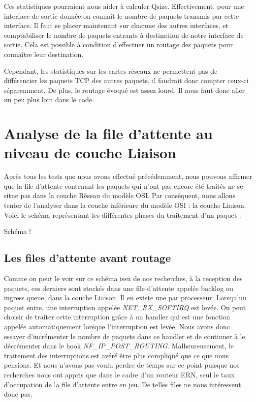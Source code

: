 \documentclass[a4paper]{article}
\begin{document}
Ces statistiques pourraient nous aider à calculer Qsize. 
Effectivement, pour une interface de sortie donnée on connaît le
nombre de paquets transmis par cette interface.
Il faut se placer maintenant sur chacune des autres interfaces, et
comptabiliser le nombre de paquets entrants à destination
de notre interface de sortie. Cela est possible à condition
d'effectuer un routage des paquets pour connaître leur destination.

Cependant, les statistiques sur les cartes réseaux ne permettent pas de
différencier les paquets TCP des autres paquets, il faudrait
donc compter ceux-ci séparemment. De plus, le routage évoqué
est assez lourd. Il nous faut donc aller un peu plus loin dans le code.

\section{Analyse de la file d'attente au niveau de couche Liaison}

Après tous les tests que nous avons effectué précédemment, nous pouvons affirmer
 que la file d'attente contenant les paquets qui n'ont pas encore été traités ne
  se situe pas dans la couche Réseau du modèle 
  OSI. Par conséquent, nous allons tenter de l'analyser dans la couche
   inférieure du modèle OSI : la couche Liaison. Voici le schéma représentant
    les différentes phases du traitement d'un paquet :

Schéma !

\subsection{Les files d'attente avant routage}
Comme on peut le voir sur ce schéma issu de nos recherches, à la reception des paquets, ces derniers sont stockés dans une file d'attente appelée backlog \cite{10poin} ou ingress queue, dans la couche Liaison. Il en existe une par processeur. 
Lorsqu'un paquet entre, une interruption appelée \textit{NET\_RX\_SOFTIRQ} est levée. On peut choisir de traiter cette interruption grâce à un handler qui est une fonction appelée automatiquement lorsque l'interruption est levée. Nous avons donc essayer d'incrémenter le nombre de paquets dans ce handler et de continuer à le décrémenter  dans le hook \textit{NF\_IP\_POST\_ROUTING}. Malheureusement, le traitement des interruptions est avéré être plus compliqué que ce que nous pensions. Et nous n'avons pas voulu perdre de temps sur ce point puisque nos recherches nous ont appris que dans le cadre d'un routeur ERN, seul le taux d'occupation de la file d'attente entre en jeu. De telles files ne nous intéressent donc pas. 
\end{document}
